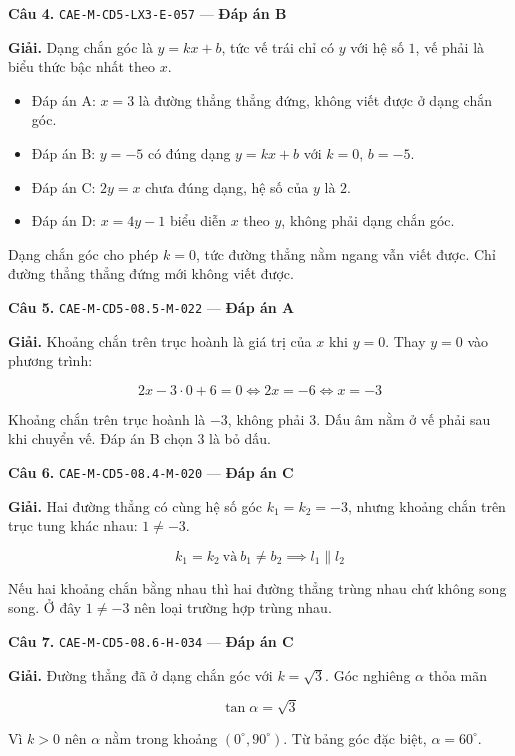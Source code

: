 \documentclass[11pt, a4paper]{article}
\begin{document}
\textbf{Câu 4.} \texttt{CAE-M-CD5-LX3-E-057} — \textbf{Đáp án B}

\textbf{Giải.} Dạng chắn góc là $y = kx + b$, tức vế trái chỉ có $y$ với hệ số $1$, vế phải là biểu thức bậc nhất theo $x$.

\begin{itemize}[leftmargin=1.4em, itemsep=2pt]
\item Đáp án A: $x = 3$ là đường thẳng thẳng đứng, không viết được ở dạng chắn góc.
\item Đáp án B: $y = -5$ có đúng dạng $y = kx + b$ với $k = 0$, $b = -5$.
\item Đáp án C: $2y = x$ chưa đúng dạng, hệ số của $y$ là $2$.
\item Đáp án D: $x = 4y - 1$ biểu diễn $x$ theo $y$, không phải dạng chắn góc.
\end{itemize}

 Dạng chắn góc cho phép $k = 0$, tức đường thẳng nằm ngang vẫn viết được. Chỉ đường thẳng thẳng đứng mới không viết được.

\textbf{Câu 5.} \texttt{CAE-M-CD5-08.5-M-022} — \textbf{Đáp án A}

\textbf{Giải.} Khoảng chắn trên trục hoành là giá trị của $x$ khi $y = 0$. Thay $y = 0$ vào phương trình:

$$2x - 3 \cdot 0 + 6 = 0 \iff 2x = -6 \iff x = -3$$

 Khoảng chắn trên trục hoành là $-3$, không phải $3$. Dấu âm nằm ở vế phải sau khi chuyển vế. Đáp án B chọn $3$ là bỏ dấu.

\textbf{Câu 6.} \texttt{CAE-M-CD5-08.4-M-020} — \textbf{Đáp án C}

\textbf{Giải.} Hai đường thẳng có cùng hệ số góc $k_1 = k_2 = -3$, nhưng khoảng chắn trên trục tung khác nhau: $1 \ne -3$.

$$k_1 = k_2 \ \text{và} \ b_1 \ne b_2 \implies l_1 \parallel l_2$$

 Nếu hai khoảng chắn bằng nhau thì hai đường thẳng trùng nhau chứ không song song. Ở đây $1 \ne -3$ nên loại trường hợp trùng nhau.

\textbf{Câu 7.} \texttt{CAE-M-CD5-08.6-H-034} — \textbf{Đáp án C}

\textbf{Giải.} Đường thẳng đã ở dạng chắn góc với $k = \sqrt{3}$. Góc nghiêng $\alpha$ thỏa mãn

$$\tan\alpha = \sqrt{3}$$

Vì $k > 0$ nên $\alpha$ nằm trong khoảng $(0^\circ, 90^\circ)$. Từ bảng góc đặc biệt, $\alpha = 60^\circ$.
\end{document}
